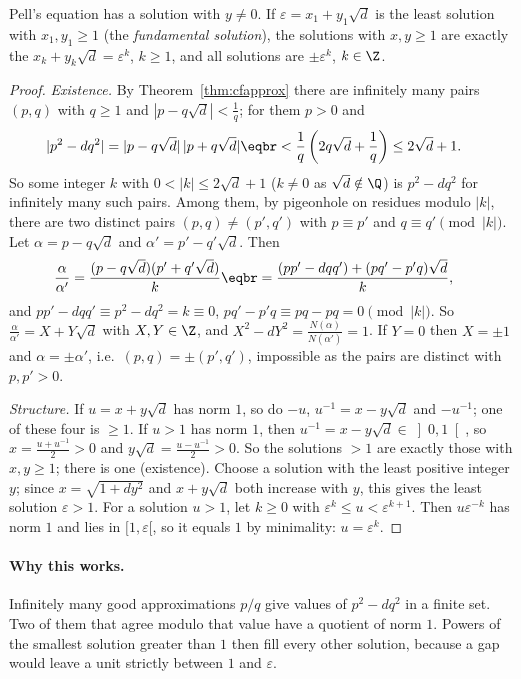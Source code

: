 \begin{theorem}[Lagrange, 1768]\label{thm:pell}
Pell's equation has a solution with $y\ne0$. If $\varepsilon=x_1+y_1\sqrt d$ is the least solution with $x_1,y_1\ge1$ (the \emph{fundamental solution}), the solutions with $x,y\ge1$ are exactly the $x_k+y_k\sqrt d=\varepsilon^k$, $k\ge1$, and all solutions are $\pm\varepsilon^k$, $k\in\Z$.
\end{theorem}
\begin{proof}
\emph{Existence.} By Theorem~\ref{thm:cfapprox} there are infinitely many pairs $(p,q)$ with $q\ge1$ and $|p-q\sqrt d|<\frac1q$; for them $p>0$ and
\[
\begin{aligned}|p^2-dq^2|&=|p-q\sqrt d|\,|p+q\sqrt d|\eqbr<\frac1q\left(2q\sqrt d+\frac1q\right)\le2\sqrt d+1.\end{aligned}
\]
So some integer $k$ with $0<|k|\le2\sqrt d+1$ ($k\ne0$ as $\sqrt d\notin\Q$) is $p^2-dq^2$ for infinitely many such pairs. Among them, by pigeonhole on residues modulo $|k|$, there are two distinct pairs $(p,q)\ne(p',q')$ with $p\equiv p'$ and $q\equiv q'\pmod{|k|}$. Let $\alpha=p-q\sqrt d$ and $\alpha'=p'-q'\sqrt d$. Then
\[
\begin{aligned}\frac\alpha{\alpha'}&=\frac{(p-q\sqrt d)(p'+q'\sqrt d)}{k}\eqbr=\frac{(pp'-dqq')+(pq'-p'q)\sqrt d}k,\end{aligned}
\]
and $pp'-dqq'\equiv p^2-dq^2=k\equiv0$, $pq'-p'q\equiv pq-pq=0\pmod{|k|}$. So $\frac\alpha{\alpha'}=X+Y\sqrt d$ with $X,Y\in\Z$, and $X^2-dY^2=\frac{N(\alpha)}{N(\alpha')}=1$. If $Y=0$ then $X=\pm1$ and $\alpha=\pm\alpha'$, i.e.\ $(p,q)=\pm(p',q')$, impossible as the pairs are distinct with $p,p'>0$.

\emph{Structure.} If $u=x+y\sqrt d$ has norm $1$, so do $-u$, $u^{-1}=x-y\sqrt d$ and $-u^{-1}$; one of these four is $\ge1$. If $u>1$ has norm $1$, then $u^{-1}=x-y\sqrt d\in\left]0,1\right[$, so $x=\frac{u+u^{-1}}2>0$ and $y\sqrt d=\frac{u-u^{-1}}2>0$. So the solutions $>1$ are exactly those with $x,y\ge1$; there is one (existence). Choose a solution with the least positive integer $y$; since $x=\sqrt{1+dy^2}$ and $x+y\sqrt d$ both increase with $y$, this gives the least solution $\varepsilon>1$. For a solution $u>1$, let $k\ge0$ with $\varepsilon^k\le u<\varepsilon^{k+1}$. Then $u\varepsilon^{-k}$ has norm $1$ and lies in $[1,\varepsilon[$, so it equals $1$ by minimality: $u=\varepsilon^k$.
\end{proof}

\paragraph{Why this works.}
Infinitely many good approximations $p/q$ give values of $p^2-dq^2$ in a finite set. Two of them that agree modulo that value have a quotient of norm $1$. Powers of the smallest solution greater than $1$ then fill every other solution, because a gap would leave a unit strictly between $1$ and $\varepsilon$.

